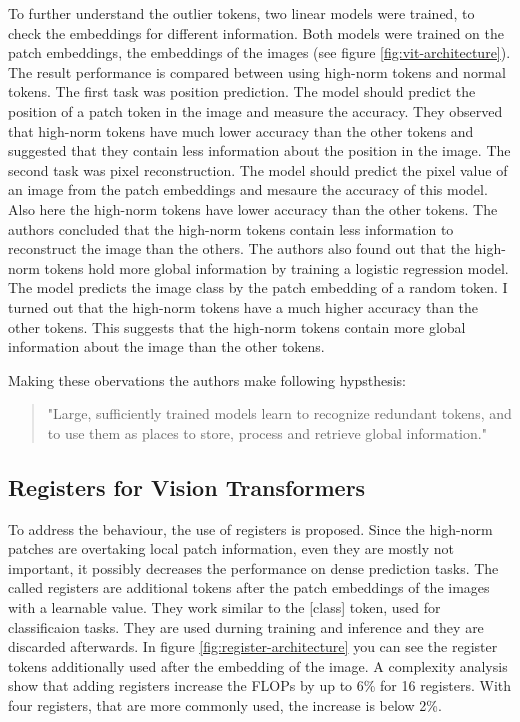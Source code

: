 \documentclass[conference]{IEEEtran}
\begin{document}
  To further understand the outlier tokens, two linear models were trained, to check the embeddings for different information. Both models were trained on the patch embeddings, the embeddings of the images (see figure \ref{fig:vit-architecture}). The result performance is compared between using high-norm tokens and normal tokens. The first task was position prediction. The model should predict the position of a patch token in the image and measure the accuracy. They observed that high-norm tokens have much lower accuracy than the other tokens and suggested that they contain less information about the position in the image. The second task was pixel reconstruction. The model should predict the pixel value of an image from the patch embeddings and mesaure the accuracy of this model. Also here the high-norm tokens have  lower accuracy than the other tokens. The authors concluded that the high-norm tokens contain less information to reconstruct the image than the others. 
  The authors also found out that the high-norm tokens hold more global information by training a logistic regression model. The model predicts the image class by the patch embedding of a random token. I turned out that the high-norm tokens have a much higher accuracy than the other tokens. This suggests that the high-norm tokens contain more global information about the image than the other tokens. 

  Making these obervations the authors make following hypsthesis:
  \begin{quote}
    "Large, sufficiently trained models learn to recognize redundant tokens, and to use them as places to store, process and retrieve global information." \cite{registers}
  \end{quote}

  \subsection{Registers for Vision Transformers}
  \label{sec:registers:registers}


  To address the behaviour, the use of registers is proposed. Since the high-norm patches are overtaking local patch information, even they are mostly not important, it possibly decreases the performance on dense prediction tasks. The called registers are additional tokens after the patch embeddings of the images with a learnable value. They work similar to the [class] token, used for classificaion tasks. They are used durning training and inference and they are discarded afterwards. In figure \ref{fig:register-architecture} you can see the register tokens additionally used after the embedding of the image. A complexity analysis show that adding registers increase the FLOPs by up to 6\% for 16 registers. With four registers, that are more commonly used, the increase is below 2\%.
\end{document}
